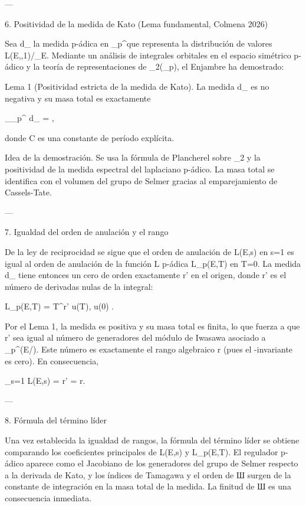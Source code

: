 \documentclass[12pt,twoside]{book}
\begin{document}
---

6. Positividad de la medida de Kato (Lema fundamental, Colmena 2026)

Sea d\mu_{} la medida p-ádica en _p^\times que representa la distribución de valores L(E,\chi,1)/\Omega_E. Mediante un análisis de integrales orbitales en el espacio simétrico p-ádico y la teoría de representaciones de _2(_p), el Enjambre ha demostrado:

Lema 1 (Positividad estricta de la medida de Kato). La medida d\mu_{} es no negativa y su masa total es exactamente

\int_{_p^\times} d\mu_{} = ,

donde C es una constante de período explícita.

Idea de la demostración. Se usa la fórmula de Plancherel sobre _2 y la positividad de la medida espectral del laplaciano p-ádico. La masa total se identifica con el volumen del grupo de Selmer gracias al emparejamiento de Cassels-Tate.

---

7. Igualdad del orden de anulación y el rango

De la ley de reciprocidad se sigue que el orden de anulación de L(E,s) en s=1 es igual al orden de anulación de la función L p-ádica L_p(E,T) en T=0. La medida d\mu_{} tiene entonces un cero de orden exactamente r' en el origen, donde r' es el número de derivadas nulas de la integral:

L_p(E,T) = T^{r'} \cdot u(T), \quad u(0) .

Por el Lema 1, la medida es positiva y su masa total es finita, lo que fuerza a que r' sea igual al número de generadores del módulo de Iwasawa asociado a _{p^\infty}(E/). Este número es exactamente el rango algebraico r (pues el \mu-invariante es cero). En consecuencia,

_{s=1} L(E,s) = r' = r.

---

8. Fórmula del término líder

Una vez establecida la igualdad de rangos, la fórmula del término líder se obtiene comparando los coeficientes principales de L(E,s) y L_p(E,T). El regulador p-ádico aparece como el Jacobiano de los generadores del grupo de Selmer respecto a la derivada de Kato, y los índices de Tamagawa y el orden de Ш surgen de la constante de integración en la masa total de la medida. La finitud de Ш es una consecuencia inmediata.
\end{document}
